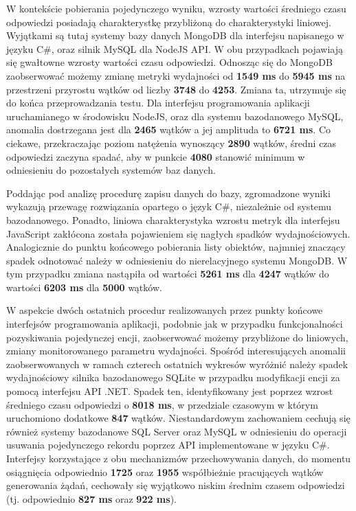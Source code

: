 W kontekście pobierania pojedynczego wyniku, wzrosty wartości średniego czasu odpowiedzi posiadają charakterystkę przybliżoną do charakterystyki liniowej. Wyjątkami są tutaj systemy bazy danych MongoDB dla interfejsu napisanego w języku C\#, oraz silnik MySQL dla NodeJS API. W obu przypadkach pojawiają się gwałtowne wzrosty wartości czasu odpowiedzi. Odnosząc się do MongoDB zaobserwować możemy zmianę metryki wydajności od \textbf{1549 ms} do \textbf{5945 ms} na przestrzeni przyrostu wątków od liczby \textbf{3748} do \textbf{4253}. Zmiana ta, utrzymuje się do końca przeprowadzania testu. Dla interfejsu programowania aplikacji uruchamianego w środowisku NodeJS, oraz dla systemu bazodanowego MySQL, anomalia dostrzegana jest dla \textbf{2465} wątków a jej amplituda to \textbf{6721 ms}. Co ciekawe, przekraczając poziom natężenia wynoszący \textbf{2890} wątków, średni czas odpowiedzi zaczyna spadać, aby w punkcie \textbf{4080} stanowić minimum w odniesieniu do pozostałych systemów baz danych.

Poddając pod analizę procedurę zapisu danych do bazy, zgromadzone wyniki wykazują przewagę rozwiązania opartego o język C\#, niezależnie od systemu bazodanowego. Ponadto, liniowa charakterystyka wzrostu metryk dla interfejsu JavaScript zakłócona została pojawieniem się nagłych spadków wydajnościowych. Analogicznie do punktu końcowego pobierania listy obiektów, najmniej znaczący spadek odnotować należy w odniesieniu do nierelacyjnego systemu MongoDB. W tym przypadku zmiana nastąpiła od wartości \textbf{5261 ms} dla \textbf{4247} wątków do wartości \textbf{6203 ms} dla \textbf{5000} wątków.
    
W aspekcie dwóch ostatnich procedur realizowanych przez punkty końcowe interfejsów programowania aplikacji, podobnie jak w przypadku funkcjonalności pozyskiwania pojedynczej encji, zaobserwować możemy przybliżone do liniowych, zmiany monitorowanego parametru wydajności. Spośród interesujących anomalii zaobserwowanych w ramach czterech ostatnich wykresów wyróżnić należy spadek wydajnościowy silnika bazodanowego SQLite w przypadku modyfikacji encji za pomocą interfejsu API .NET. Spadek ten, identyfikowany jest poprzez wzrost średniego czasu odpowiedzi o \textbf{8018 ms}, w przedziale czasowym w którym uruchomiono dodatkowe \textbf{847} wątków. Niestandardowym zachowaniem cechują się również systemy bazodanowe SQL Server oraz MySQL w odniesieniu do operacji usuwania pojedynczego rekordu poprzez API implementowane w języku C\#. Interfejsy korzystające z obu mechanizmów przechowywania danych, do momentu osiągnięcia odpowiednio \textbf{1725} oraz \textbf{1955} współbieżnie pracujących wątków generowania żądań, cechowały się wyjątkowo niskim średnim czasem odpowiedzi (tj. odpowiednio \textbf{827 ms} oraz \textbf{922 ms}).

